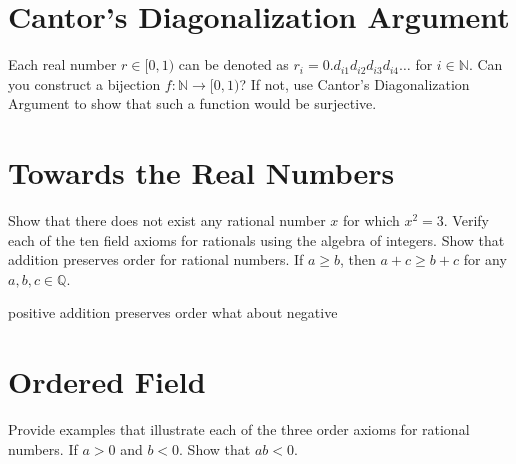 \documentclass[12pt]{exam}
\begin{document}
\section{Cantor's Diagonalization Argument}
\begin{questions}
\question Each real number $r \in [0,1)$ can be denoted as $r_i = 0.d_{i1}d_{i2}d_{i3}d_{i4}\ldots$ for $i \in \mathbb{N}$. Can you construct a bijection $f : \mathbb{N} \to [0,1)$? If not, use Cantor's Diagonalization Argument to show that such a function would be surjective.
\end{questions}
\section{Towards the Real Numbers}
\begin{questions}
    \question Show that there does not exist any rational number $x$ for which $x^2 = 3$.
    \question Verify each of the ten field axioms for rationals using the algebra of integers.
    \question Show that addition preserves order for rational numbers. If $a \geq b$, then $a + c \geq b + c$ for any $a, b, c \in \mathbb{Q}$.

    positive addition preserves order
    what about negative 
\end{questions}
\section{Ordered Field}
\begin{questions}
    \question Provide examples that illustrate each of the three order axioms for rational numbers.
    \question If $a > 0$ and $b < 0$. Show that $ab < 0$.
\end{questions}
\end{document}
